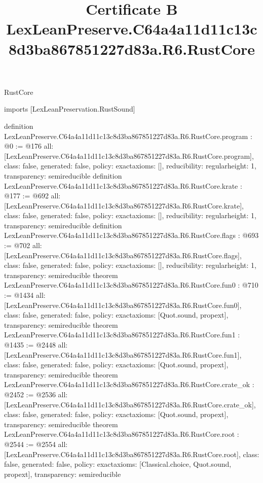 \begin{lexlean}{RustCore}
\title{Certificate B LexLeanPreserve.C64a4a11d11c13c8d3ba867851227d83a.R6.RustCore}
\begin{coremodule}
imports [LexLeanPreservation.RustSound]

definition LexLeanPreserve.C64a4a11d11c13c8d3ba867851227d83a.R6.RustCore.program : @0 := @176 {
  all: [LexLeanPreserve.C64a4a11d11c13c8d3ba867851227d83a.R6.RustCore.program],
  class: false,
  generated: false,
  policy: exact{axioms: []},
  reducibility: regular{height: 1},
  transparency: semireducible
}
definition LexLeanPreserve.C64a4a11d11c13c8d3ba867851227d83a.R6.RustCore.krate : @177 := @692 {
  all: [LexLeanPreserve.C64a4a11d11c13c8d3ba867851227d83a.R6.RustCore.krate],
  class: false,
  generated: false,
  policy: exact{axioms: []},
  reducibility: regular{height: 1},
  transparency: semireducible
}
definition LexLeanPreserve.C64a4a11d11c13c8d3ba867851227d83a.R6.RustCore.flags : @693 := @702 {
  all: [LexLeanPreserve.C64a4a11d11c13c8d3ba867851227d83a.R6.RustCore.flags],
  class: false,
  generated: false,
  policy: exact{axioms: []},
  reducibility: regular{height: 1},
  transparency: semireducible
}
theorem LexLeanPreserve.C64a4a11d11c13c8d3ba867851227d83a.R6.RustCore.fun0 : @710 := @1434 {
  all: [LexLeanPreserve.C64a4a11d11c13c8d3ba867851227d83a.R6.RustCore.fun0],
  class: false,
  generated: false,
  policy: exact{axioms: [Quot.sound, propext]},
  transparency: semireducible
}
theorem LexLeanPreserve.C64a4a11d11c13c8d3ba867851227d83a.R6.RustCore.fun1 : @1435 := @2448 {
  all: [LexLeanPreserve.C64a4a11d11c13c8d3ba867851227d83a.R6.RustCore.fun1],
  class: false,
  generated: false,
  policy: exact{axioms: [Quot.sound, propext]},
  transparency: semireducible
}
theorem LexLeanPreserve.C64a4a11d11c13c8d3ba867851227d83a.R6.RustCore.crate_ok : @2452 := @2536 {
  all: [LexLeanPreserve.C64a4a11d11c13c8d3ba867851227d83a.R6.RustCore.crate_ok],
  class: false,
  generated: false,
  policy: exact{axioms: [Quot.sound, propext]},
  transparency: semireducible
}
theorem LexLeanPreserve.C64a4a11d11c13c8d3ba867851227d83a.R6.RustCore.root : @2544 := @2554 {
  all: [LexLeanPreserve.C64a4a11d11c13c8d3ba867851227d83a.R6.RustCore.root],
  class: false,
  generated: false,
  policy: exact{axioms: [Classical.choice, Quot.sound, propext]},
  transparency: semireducible
}


\end{coremodule}
\end{lexlean}
